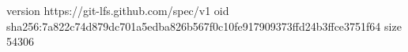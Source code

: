 version https://git-lfs.github.com/spec/v1
oid sha256:7a822c74d879dc701a5edba826b567f0c10fe917909373ffd24b3ffce3751f64
size 54306
